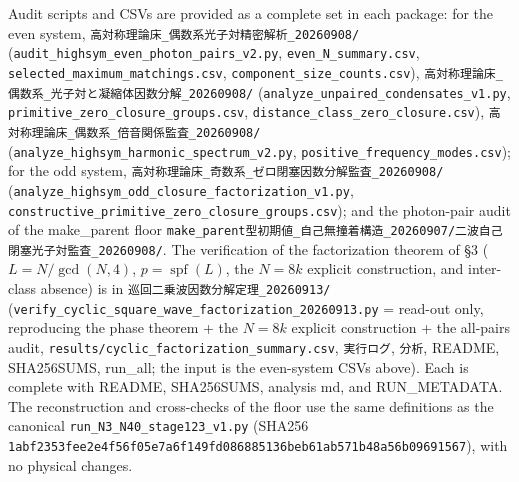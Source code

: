 \documentclass[
  a4paper,
]{ltjsarticle}
\begin{document}
Audit scripts and CSVs are provided as a complete set in each package:
for the even system,
\texttt{高対称理論床\_偶数系光子対精密解析\_20260908/}
(\texttt{audit\_highsym\_even\_photon\_pairs\_v2.py},
\texttt{even\_N\_summary.csv},
\texttt{selected\_maximum\_matchings.csv},
\texttt{component\_size\_counts.csv}),
\texttt{高対称理論床\_偶数系\_光子対と凝縮体因数分解\_20260908/}
(\texttt{analyze\_unpaired\_condensates\_v1.py},
\texttt{primitive\_zero\_closure\_groups.csv},
\texttt{distance\_class\_zero\_closure.csv}),
\texttt{高対称理論床\_偶数系\_倍音関係監査\_20260908/}
(\texttt{analyze\_highsym\_harmonic\_spectrum\_v2.py},
\texttt{positive\_frequency\_modes.csv}); for the odd system,
\texttt{高対称理論床\_奇数系\_ゼロ閉塞因数分解監査\_20260908/}
(\texttt{analyze\_highsym\_odd\_closure\_factorization\_v1.py},
\texttt{constructive\_primitive\_zero\_closure\_groups.csv}); and the
photon-pair audit of the make\_parent floor
\texttt{make\_parent型初期値\_自己無撞着構造\_20260907/二波自己閉塞光子対監査\_20260908/}.
The verification of the factorization theorem of §3 (\(L=N/\gcd(N,4)\),
\(p=\operatorname{spf}(L)\), the \(N=8k\) explicit construction, and
inter-class absence) is in \texttt{巡回二乗波因数分解定理\_20260913/}
(\texttt{verify\_cyclic\_square\_wave\_factorization\_20260913.py} =
read-out only, reproducing the phase theorem + the \(N=8k\) explicit
construction + the all-pairs audit,
\texttt{results/cyclic\_factorization\_summary.csv}, \texttt{実行ログ},
\texttt{分析}, README, SHA256SUMS, run\_all; the input is the
even-system CSVs above). Each is complete with README, SHA256SUMS,
analysis md, and RUN\_METADATA. The reconstruction and cross-checks of
the floor use the same definitions as the canonical
\texttt{run\_N3\_N40\_stage123\_v1.py} (SHA256
\texttt{1abf2353fee2e4f56f05e7a6f149fd086885136beb61ab571b48a56b09691567}),
with no physical changes.
\end{document}
